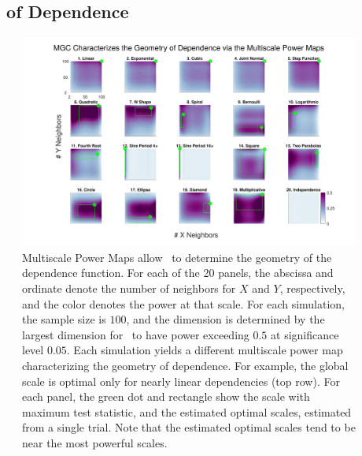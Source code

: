 \documentclass[11pt]{article}
\begin{document}
\subsection*{\Mgc~ of Dependence}
\label{main3}

\begin{figure}[!ht]
\includegraphics[width=1.0\textwidth,trim={3cm 0.5cm 2.3cm 0.5cm},clip]{Figures/FigHDHeat}
\caption{Multiscale Power Maps allow \Mgc~to determine the geometry of the dependence function.
For each of the 20 panels, the abscissa and ordinate denote the number of neighbors for $X$ and  $Y$, respectively, and the color denotes the power at that scale. For each simulation, the sample size is $100$,  and the dimension is determined by the largest dimension for \Mgc~to have power exceeding $0.5$ at significance level $0.05$. Each simulation yields a different multiscale power map characterizing the geometry of dependence. 
For example, the global scale is optimal only for nearly linear dependencies (top row). 
For each panel, the green dot and rectangle show the scale with maximum test statistic,  and the estimated optimal scales, estimated from a single trial. Note that the estimated optimal scales tend to be near the most powerful scales.
}
\label{f:powermaps}
\end{figure}
\end{document}
